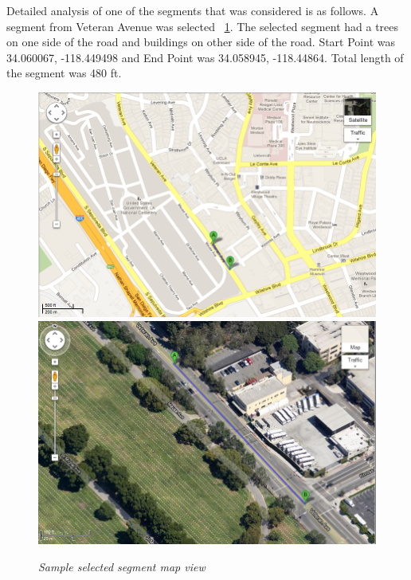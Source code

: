 \documentclass[10pt]{sigplan-proc-varsize}
\begin{document}
Detailed analysis of one of the segments that was considered is as follows. A segment from Veteran Avenue was selected ~\ref{fig:veteranSatellite}. The selected segment had a trees on one side of the road and buildings on other side of the road. Start Point was 34.060067, -118.449498 and End Point was 34.058945, -118.44864. Total length of the segment was 480 ft.\\
\begin{figure}
\begin{center}
\includegraphics[scale=0.25]{veteranMap.png}
\includegraphics[scale=0.25]{veteranSatellite.png}
\caption{\small \sl Sample selected segment map view}\label{fig:veteranSatellite}
\end{center}
\end{figure}
\end{document}
